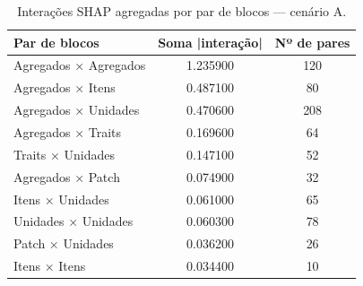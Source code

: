 \begin{table}[htbp]
\caption{Interações SHAP agregadas por par de blocos — cenário A.}
\label{tab:interbA}
\centering
\small
\begin{tabular}{lcc}
\toprule
Par de blocos & Soma |interação| & Nº de pares \\
\midrule
Agregados × Agregados & 1.235900 & 120 \\
Agregados × Itens & 0.487100 & 80 \\
Agregados × Unidades & 0.470600 & 208 \\
Agregados × Traits & 0.169600 & 64 \\
Traits × Unidades & 0.147100 & 52 \\
Agregados × Patch & 0.074900 & 32 \\
Itens × Unidades & 0.061000 & 65 \\
Unidades × Unidades & 0.060300 & 78 \\
Patch × Unidades & 0.036200 & 26 \\
Itens × Itens & 0.034400 & 10 \\
\bottomrule
\end{tabular}
\end{table}
